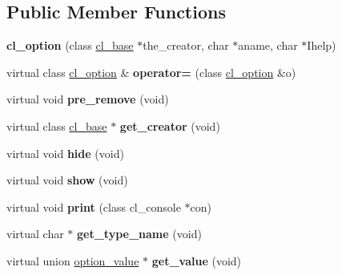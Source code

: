 \subsection*{Public Member Functions}
\begin{DoxyCompactItemize}
\item 
\hypertarget{classcl__option_a52aee9817e2fe084379419f204d8d660}{
{\bfseries cl\_\-option} (class \hyperlink{classcl__base}{cl\_\-base} $\ast$the\_\-creator, char $\ast$aname, char $\ast$Ihelp)}
\label{classcl__option_a52aee9817e2fe084379419f204d8d660}

\item 
\hypertarget{classcl__option_a974b7e378703a036c393e569cfbf093a}{
virtual class \hyperlink{classcl__option}{cl\_\-option} \& {\bfseries operator=} (class \hyperlink{classcl__option}{cl\_\-option} \&o)}
\label{classcl__option_a974b7e378703a036c393e569cfbf093a}

\item 
\hypertarget{classcl__option_a50496fdfcf2615d97374bc45084e2679}{
virtual void {\bfseries pre\_\-remove} (void)}
\label{classcl__option_a50496fdfcf2615d97374bc45084e2679}

\item 
\hypertarget{classcl__option_ac2ce92605135b725ca7167968832d69f}{
virtual class \hyperlink{classcl__base}{cl\_\-base} $\ast$ {\bfseries get\_\-creator} (void)}
\label{classcl__option_ac2ce92605135b725ca7167968832d69f}

\item 
\hypertarget{classcl__option_a9666c5ad17c176456e3768ede3fe37e9}{
virtual void {\bfseries hide} (void)}
\label{classcl__option_a9666c5ad17c176456e3768ede3fe37e9}

\item 
\hypertarget{classcl__option_ace1e7456180a339b220bb0b09128d694}{
virtual void {\bfseries show} (void)}
\label{classcl__option_ace1e7456180a339b220bb0b09128d694}

\item 
\hypertarget{classcl__option_a357c40dde81a6331c48933e558c5bc57}{
virtual void {\bfseries print} (class cl\_\-console $\ast$con)}
\label{classcl__option_a357c40dde81a6331c48933e558c5bc57}

\item 
\hypertarget{classcl__option_a23a99f00e80e4155cf11e7e6ba4cbc4b}{
virtual char $\ast$ {\bfseries get\_\-type\_\-name} (void)}
\label{classcl__option_a23a99f00e80e4155cf11e7e6ba4cbc4b}

\item 
\hypertarget{classcl__option_a3bc048ec1d4a2b984f6e9adfce35f197}{
virtual union \hyperlink{unionoption__value}{option\_\-value} $\ast$ {\bfseries get\_\-value} (void)}
\label{classcl__option_a3bc048ec1d4a2b984f6e9adfce35f197}


\end{DoxyCompactItemize}
